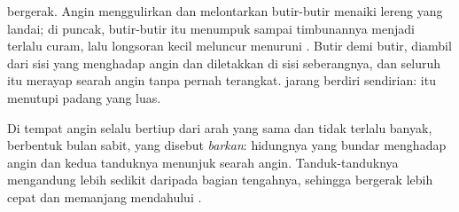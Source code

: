  bergerak. Angin menggulirkan dan melontarkan butir-butir 
menaiki lereng yang landai; di puncak, butir-butir itu menumpuk sampai
timbunannya menjadi terlalu curam, lalu longsoran kecil  meluncur
menuruni . Butir demi butir,  diambil dari sisi yang
menghadap angin dan diletakkan di sisi seberangnya, dan seluruh  itu
merayap searah angin tanpa pernah terangkat.  jarang berdiri
sendirian:  itu menutupi padang yang luas.

Di tempat angin selalu bertiup dari arah yang sama dan  tidak
terlalu banyak,  berbentuk bulan sabit, yang disebut
\emph{barkan}: hidungnya yang bundar menghadap angin dan kedua tanduknya
menunjuk searah angin. Tanduk-tanduknya mengandung lebih sedikit 
daripada bagian tengahnya, sehingga bergerak lebih cepat dan memanjang
mendahului .

